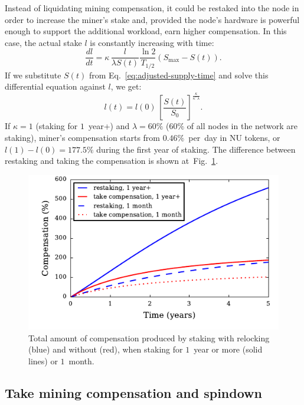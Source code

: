 \documentclass[longbibliography,nofootinbib,twocolumn]{revtex4-1}
\newcommand{\figref}[1]{Fig.~\ref{#1}}
\begin{document}
Instead of liquidating mining compensation, it could be restaked into the node in order to increase the miner's stake and, provided the node's hardware is
powerful enough to support the additional workload, earn higher compensation.
In this case, the actual stake $l$ is constantly increasing with time:
\begin{equation}
    \frac{dl}{dt} =  \kappa\, \frac{l}{\lambda S(t)} \frac{\ln{2}}{T_{1/2}} \left( S_{\max} - S(t)\right).
\end{equation}
If we substitute $S(t)$ from Eq.~\ref{eq:adjusted-supply-time} and solve this differential equation against $l$, we get:
\begin{equation}
    l(t) = l(0)\,\left[ \frac{S(t)}{S_0} \right]^{\frac{\kappa}{\kappa^* \lambda}}.
\end{equation}
If $\kappa=1$ (staking for $1$~year+) and $\lambda=60\%$ ($60\%$ of all nodes in the network are staking),
miner's compensation starts from $0.46\%$~per~day in NU tokens,
or $l(1) - l(0) = 177.5\%$ during the first year of staking.
The difference between restaking and taking the compensation is shown at~\figref{fig:total-compensation}.


\begin{figure}
    \includegraphics[width=\columnwidth]{pdf/total-compensation.pdf}
    \caption{Total amount of compensation produced by staking with relocking (blue) and without (red),
        when staking for $1$~year or more (solid lines) or $1$~month.}
    \label{fig:total-compensation}
\end{figure}

\subsection{Take mining compensation and spindown}
\end{document}
